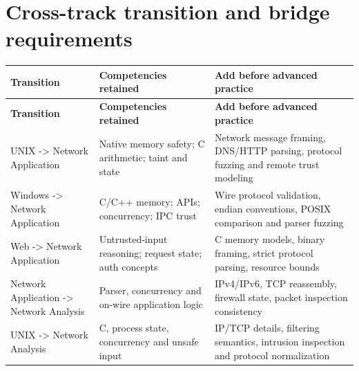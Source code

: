 \documentclass[10pt,letterpaper]{article}
\begin{document}
\section{Cross-track transition and bridge requirements}
\begingroup\footnotesize\setlength\tabcolsep{3pt}
\begin{longtable}{>{\raggedright\arraybackslash}p{}>{\raggedright\arraybackslash}p{}>{\raggedright\arraybackslash}p{}}\toprule
\textbf{Transition} & \textbf{Competencies retained} & \textbf{Add before advanced practice}\\\midrule\endfirsthead
\toprule \textbf{Transition} & \textbf{Competencies retained} & \textbf{Add before advanced practice}\\\midrule\endhead
UNIX -> Network Application & Native memory safety; C arithmetic; taint and state & Network message framing, DNS/HTTP parsing, protocol fuzzing and remote trust modeling\\\midrule
Windows -> Network Application & C/C++ memory; APIs; concurrency; IPC trust & Wire protocol validation, endian conventions, POSIX comparison and parser fuzzing\\\midrule
Web -> Network Application & Untrusted-input reasoning; request state; auth concepts & C memory models, binary framing, strict protocol parsing, resource bounds\\\midrule
Network Application -> Network Analysis & Parser, concurrency and on-wire application logic & IPv4/IPv6, TCP reassembly, firewall state, packet inspection consistency\\\midrule
UNIX -> Network Analysis & C, process state, concurrency and unsafe input & IP/TCP details, filtering semantics, intrusion inspection and protocol normalization\\\midrule
\bottomrule\end{longtable}\endgroup
\end{document}
